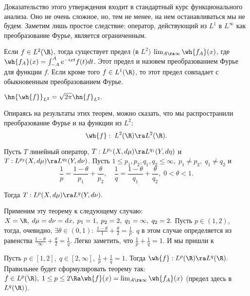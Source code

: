 \documentclass[a4paper]{article}
\begin{document}
Доказательство этого утверждения входит в стандартный курс функционального анализа. Оно не очень сложное, но,
тем не менее, на нем останавливаться мы не будем. Заметим лишь простое следствие: оператор, действующий из
$L^1$ в $L^{\infty}$ как преобразование Фурье, является ограниченным.

\begin{theorem}[Планшерель] Если $f\in L^2(\R )$, тогда существует предел (в $L^2)$ $\lim_{A\ra\infty}\wh{f_A}(x)$, где $\wh{f_A}(x)=\int_{-A}^A
e^{-ixt}f(t)dt$. Этот предел и назовем преобразованием Фурье для
функции $f$. Если кроме того $f\in L^1(\R )$, то этот предел совпадает
с обыкновенным преобразованием Фурье.
\end{theorem}

\begin{theorem}
  $\hn{\wh{f}}_{L^2}=\sqrt{2\pi}\hn{f}_{L^2}.$
\end{theorem}

Опираясь на результаты этих теорем, можно сказать, что мы распространили преобразование Фурье и на функции из
$L^2$:
$$\wh{f}:\;L^2(\R )\ra L^2(\R ).$$

\begin{theorem} Пусть $T$ линейный оператор, $T:L^{p_1}(X,d\mu)\ra
L^{q_1}(Y,d\eta)$ и $T:L^{p_2}(X,d\mu)\ra L^{q_2}(Y,d\nu)$. Пусть $1\le
p_1,p_2,q_1,q_2\le\infty,\;p_1\neq p_2,\;q_1\neq q_2$ и
\begin{equation}\label{102}
\frac1p=\frac{1-\theta}{p_1}+\frac{\theta}{p_2},\quad
\frac1q=\frac{1-\theta}{q_1}+\frac{\theta}{q_2},\;0<\theta<1.
\end{equation}

Тогда $T:L^{p}(X,d\mu)\ra L^{q}(Y,d\nu).$
\end{theorem}

Применим эту теорему к следующему случаю: $X=\R
,\;d\mu=d\nu=dx,\;p_1=1,\;p_2=2,\;q_1=\infty,\;q_2=2.$ Пусть
$p\in(1,2)$, тогда, очевидно, $\exi\theta\in(0,1):\;\frac{1-\theta}1+\frac{\theta}2=\frac1p.$ $q$ в
этом случае определяется из равенства
$\frac{1-\theta}{\infty}+\frac{\theta}2=\frac1q.$ Легко заметить, что
$\frac1p+\frac1q=1.$ И мы пришли к

\begin{theorem}
Пусть $p\in[1,2],\;q\in[2,\infty],\;\frac1p+\frac1q=1$. Тогда $\wh{f}:L^p(\R )\ra
L^q(\R ).$ Правильнее будет сформулировать теорему так: $f\in L^p(\R ),\;1\le
p\le2\Ra \wh{f}(x)=\lim_{A\ra\infty} \wh{f_A}(x)$ (предел здесь в
$L^q(\R )$).
\end{theorem}
\end{document}

